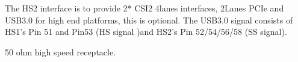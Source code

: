 \documentclass[a4paper,10pt,oneside,english]{sphinxmanual}
\begin{document}
\sphinxAtStartPar
The HS2 interface is to provide 2* CSI\sphinxhyphen{}2 4lanes interfaces, 2Lanes PCIe and USB3.0 for high end platforms, this is optional. The USB3.0 signal consists of  HS1’s Pin 51 and Pin53 (HS signal )and HS2’s Pin 52/54/56/58 (SS signal).

\sphinxAtStartPar
0.8mm 50 ohm high speed receptacle.


\begin{savenotes}\sphinxatlongtablestart{}
\end{savenotes}
\end{document}

